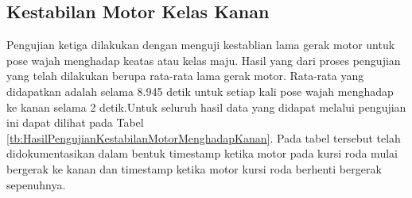 \subsection{Kestabilan Motor Kelas Kanan}
Pengujian ketiga dilakukan dengan menguji kestablian lama gerak motor untuk pose wajah menghadap keatas atau kelas maju. Hasil yang dari proses pengujian yang telah dilakukan berupa rata-rata lama gerak motor. Rata-rata yang didapatkan adalah selama 8.945 detik untuk setiap kali pose wajah menghadap ke kanan selama 2 detik.Untuk seluruh hasil data yang didapat melalui pengujian ini dapat dilihat pada Tabel \ref{tb:HasilPengujianKestabilanMotorMenghadapKanan}. Pada tabel tersebut telah didokumentasikan dalam bentuk timestamp ketika motor pada kursi roda mulai bergerak ke kanan dan timestamp ketika motor kursi roda berhenti bergerak sepenuhnya.

